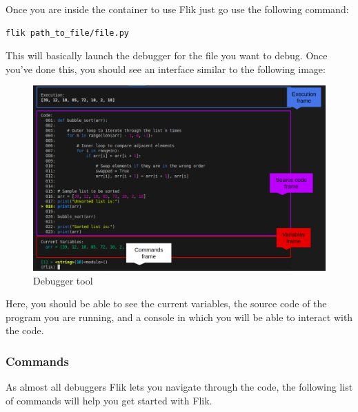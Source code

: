 Once you are inside the container to use Flik just go use the following command:

\begin{lstlisting}[language=bash]
flik path_to_file/file.py
\end{lstlisting}

This will basically launch the debugger for the file you want to debug. Once you’ve done this, you should see an interface similar to the following image:

\begin{figure}[h]
    \centering
    \includegraphics[width=1\textwidth]{figures/flik_interface.png}
    \caption{Debugger tool}
    \label{fig:debugger}
\end{figure}

Here, you should be able to see the current variables, the source code of the program you are running, and a console in which you will be able to interact with the code.

\subsubsection{Commands}
As almost all debuggers Flik lets you navigate through the code, the following list of commands will help you get started with Flik.

